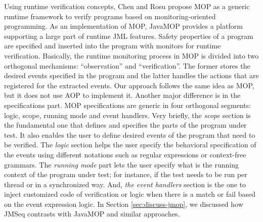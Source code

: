 Using runtime verification concepts, Chen and Rosu propose MOP
\cite{chen_rosu_mop,MOP} as a generic runtime framework to verify programs
based on monitoring-oriented programming. As an
implementation of MOP,
JavaMOP \cite{chen_rosu_jmop} provides a platform supporting a large part of
runtime JML features. Safety properties of a program are specified and 
inserted into the program with monitors for runtime verification. Basically,
the runtime monitoring process in MOP is divided into two orthogonal
mechanisms: ``observation'' and ``verification''. The former stores the desired
events specified in the program and the latter handles the actions that are
registered for the extracted events. Our approach follows the same idea as MOP,
but it does not use AOP to implement it. Another major
difference is in the specifications part. MOP specifications are  generic in
four orthogonal segments: logic, scope, running mode and event handlers.  Very
briefly, the \textit{scope} section is the fundamental one that defines and
specifies the parts of the program under test. It also enables the user to
define desired events of the program that need to be verified. The
\textit{logic} section helps the user specify the behavioral specification of
the events using different notations such as regular expressions or
context-free grammars. The \textit{running mode} part lets the user specify
what is the running context of the program under test; for instance, if the
test needs to be run per thread or in a synchronized way. And, \textit{the
event handlers} section is the one to inject customized code of verification or
logic when there is a match or fail based on the event expression logic.
In Section \ref{sec:discuss-jmop}, we discussed how JMSeq contrasts with JavaMOP and similar approaches.




   
